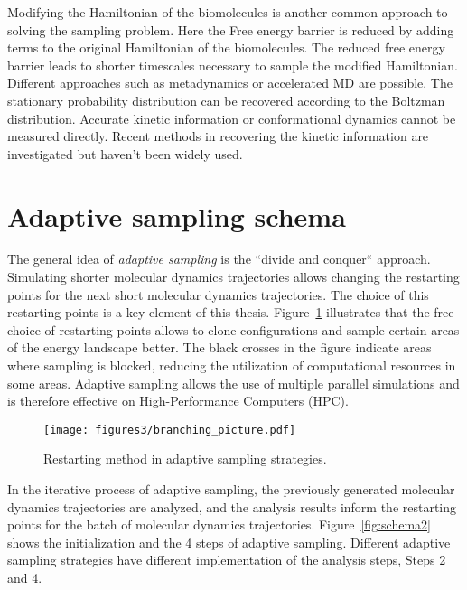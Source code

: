Modifying the Hamiltonian of the biomolecules is another common approach to solving the sampling problem. Here the Free energy barrier is reduced by adding terms to the original Hamiltonian of the biomolecules.
The reduced free energy barrier leads to shorter timescales necessary to sample the modified Hamiltonian. Different approaches such as metadynamics \cite{laio2008metadynamics} or accelerated MD\cite{hamelberg2004accelerated} are possible. The stationary probability distribution can be recovered according to the Boltzman distribution. Accurate kinetic information or conformational dynamics cannot be measured directly. Recent methods in recovering the kinetic information\cite{pathreweight1, pathreweight2, pathreweight3, pathreweight4} are investigated but haven't been widely used. 



\section{\label{sec:design}Adaptive sampling schema}


The general idea of \emph{adaptive sampling} \cite{singhal2005error, bowman2010enhanced,
weber2011characterization, Fabritiis-2014, preto2014fast, doerr2016htmd,
AdaptivePELE-Lecina2017, EvolutionCoupling-Shamsi2017, FAST-Bowman-2015, 
Strategies-erros-reduce, plattner2017complete, Adstrategies2018} is the ``divide and conquer`` approach. Simulating shorter molecular dynamics trajectories allows changing the restarting points for the next short molecular dynamics trajectories. The choice of this restarting points is a key element of this thesis. Figure~\ref{fig:branching} illustrates that the free choice of restarting points allows to clone configurations and sample certain areas of the energy landscape better. The black crosses in the figure indicate areas where sampling is blocked, reducing the utilization of computational resources in some areas.
Adaptive sampling allows the use of multiple parallel simulations and is therefore effective on High-Performance Computers (HPC).

\begin{figure}[h]
  \centering
  \texttt{[image: figures3/branching\_picture.pdf]}
  \caption{Restarting method in adaptive sampling strategies.}
  \label{fig:branching}
\end{figure}


In the iterative process of adaptive sampling, the previously generated molecular dynamics trajectories are analyzed, and the analysis results inform the restarting points for the batch of
molecular dynamics trajectories. Figure~\ref{fig:schema2} shows the initialization and the 4 steps of adaptive sampling. Different adaptive sampling strategies have different implementation of the analysis steps, Steps 2 and 4. 

